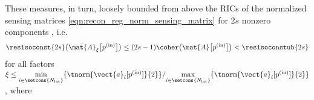 These measures, in turn, loosely bounded from above
the \acp{RIC} of
the normalized sensing matrices
\eqref{eqn:recon_reg_norm_sensing_matrix} for
$2s$ nonzero components
\cite[Prop. 6.2]{book:Foucart2013}, i.e.
\begin{equation}
  \resisoconst{ 2s }\bigl( \bar{\mat{A}}_{\xi}\bigl[ p^{(\text{in})} \bigr] \bigr)
  \leq
  ( 2s - 1 )
  \coher\bigl( \mat{A}\bigl[ p^{(\text{in})} \bigr] \bigr)
  <
  \resisoconstub{ 2s }
 \label{eqn:disc_coherence_resisoconst_ub}
\end{equation}
for
all factors
$\xi \leq \underset{ i \in \setcons{ N_{\text{lat}} } }{ \min }\{ \tnorm{ \vect{a}_{i}[ p^{(\text{in})} ] }{2} \} / \underset{ i \in \setcons{ N_{\text{lat}} } }{ \max }\{ \tnorm{ \vect{a}_{i}[ p^{(\text{in})} ] }{2} \}$, where

